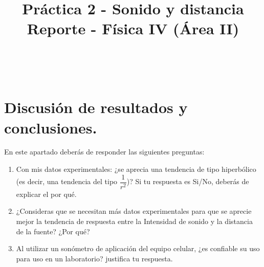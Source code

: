 \documentclass[14pt]{extarticle}
\title{\vspace*{-2cm} Práctica 2 - Sonido y distancia \\  Reporte - Física IV (Área II) \vspace{-5ex}}
\date{}
\begin{document}
\maketitle
\

\section{Discusión de resultados y conclusiones.}

En este apartado deberás de responder las siguientes preguntas:
\begin{enumerate}
\item Con mis datos experimentales: ¿se aprecia una tendencia de tipo hiperbólico (es decir, una tendencia del tipo $\dfrac{1}{r^{2}}$)? Si tu respuesta es Si/No, deberás de explicar el por qué.
\item ¿Consideras que se necesitan más datos experimentales para que se aprecie mejor la tendencia de respuesta entre la Intensidad de sonido y la distancia de la fuente? ¿Por qué?
\item Al utilizar un sonómetro de aplicación del equipo celular, ¿es confiable su uso para uso en un laboratorio? justifica tu respuesta.
\end{enumerate}
\end{document}
